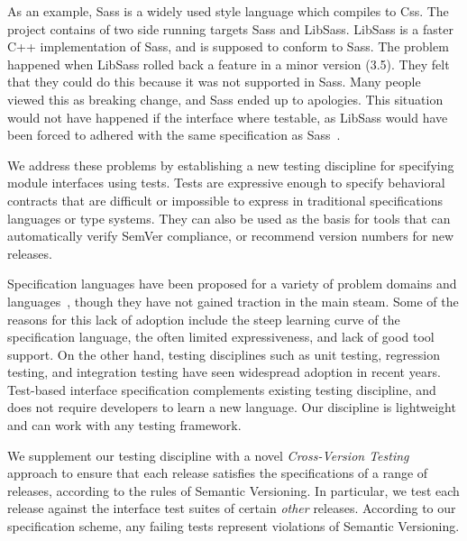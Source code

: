 As an example, Sass is a widely used style language which compiles to
Css. The project contains of two side running targets Sass and LibSass.
LibSass is a faster C++ implementation of Sass, and is supposed to
conform to Sass. The problem happened when LibSass rolled back a feature
in a minor version (3.5). They felt that they could do this because it
was not supported in Sass. Many people viewed this as breaking change,
and Sass ended up to apologies. This situation would not have happened
if the interface where testable, as LibSass would have been forced to
adhered with the same specification as Sass~\cite{libsass}. 
%



We address these problems by establishing a new testing discipline for
specifying module interfaces using tests. Tests are expressive enough
to specify behavioral contracts that are difficult or impossible to
express in traditional specifications languages or type systems. They
can also be used as the basis for tools that can automatically verify
SemVer compliance, or recommend version numbers for new releases.

Specification languages have been proposed for a variety of problem
domains and languages~\cite{uml}, though they have not gained traction
in the main steam. 
%
Some of the reasons for this lack of adoption include the steep
learning curve of the specification language, the often limited
expressiveness, and lack of good tool support.
%
On the other hand, testing disciplines such as unit testing,
regression testing, and integration testing have seen widespread
adoption in recent years.
%
Test-based interface specification complements existing testing
discipline, and does not require developers to learn a new
language. Our discipline is lightweight and can work with any testing
framework.

We supplement our testing discipline with a novel \emph{Cross-Version
Testing} approach to ensure that each release satisfies the
specifications of a range of releases, according to the rules of
Semantic Versioning. In particular, we test each release against the
interface test suites of certain {\em other} releases. According to
our specification scheme, any failing tests represent violations of
Semantic Versioning.

